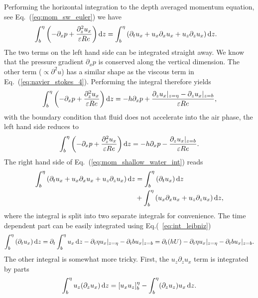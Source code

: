 Performing the horizontal integration to the depth averaged momentum equation, see Eq.~(\ref{eq:mom_sw_euler}) we have
\begin{align}\label{eq:mom_shallow_water_int}
    \int_b^{\eta}\left(-\partial_x p + \frac{\partial_z^2 u_x}{\varepsilon Re}\right)\mathop{}\!\mathrm{d} z &= \int_b^{\eta}\left(\partial_t u_x + u_x\partial_x u_x + u_z\partial_{z} u_x\right)\mathop{}\!\mathrm{d} z. 
\end{align}
The two terms on the left hand side can be integrated straight away. 
We know that the pressure gradient $\partial_x p$ is conserved along the vertical dimension. 
The other term ($\propto\partial^2 u$) has a similar shape as the viscous term in Eq.~(\ref{eq:navier_stokes_4}). 
Performing the integral therefore yields
\begin{equation}\label{eq:sw_mom_left}
    \int_b^{\eta}\left(-\partial_x p + \frac{\partial_z^2 u_x}{\varepsilon Re}\right)\mathop{}\!\mathrm{d} z = -h\partial_x p + \frac{\partial_z u_x|_{z = \eta} - \partial_z u_x|_{z=b}}{\varepsilon Re},
\end{equation}
with the boundary condition that fluid does not accelerate into the air phase, the left hand side reduces to
\begin{equation}
    \int_b^{\eta}\left(-\partial_x p + \frac{\partial_z^2 u_x}{\varepsilon Re}\right)\mathop{}\!\mathrm{d} z = -h\partial_x p - \frac{\partial_z u_x|_{z=b}}{\varepsilon Re}.
\end{equation}
The right hand side of Eq.~(\ref{eq:mom_shallow_water_int}) reads
\begin{align}\label{eq:mom_shallow_rhs}
    \int_b^{\eta}\left(\partial_t u_x + u_x\partial_x u_x + u_z\partial_{z} u_x\right)\mathop{}\!\mathrm{d} z &= \int_b^{\eta}\left(\partial_t u_x\right)\mathop{}\!\mathrm{d} z \nonumber\\
    &+ \int_b^{\eta}\left(u_x\partial_x u_x + u_z\partial_{z} u_x\right)\mathop{}\!\mathrm{d} z ,
\end{align}
where the integral is split into two separate integrals for convenience.
The time dependent part can be easily integrated using Eq.(~\ref{eq:int_leibniz})
\begin{equation}\label{eq:first_term_rhs_mom_sw}
    \int_b^{\eta}\left(\partial_t u_x\right)\mathop{}\!\mathrm{d} z = \partial_t \int_b^{\eta} u_x \mathop{}\!\mathrm{d} z - \partial_t\eta u_x|_{z=\eta} - \partial_t b u_x|_{z=b} = \partial_t(hU) - \partial_t\eta u_x|_{z=\eta} - \partial_t b u_x|_{z=b}. 
\end{equation}
The other integral is somewhat more tricky.
First, the $u_z\partial_z u_x$ term is integrated by parts
\begin{equation}
    \int_b^{\eta}u_z(\partial_{z} u_x)\mathop{}\!\mathrm{d} z = [u_x u_z]_b^{\eta} - \int_b^{\eta} (\partial_z u_z) u_x \mathop{}\!\mathrm{d} z.
\end{equation}
